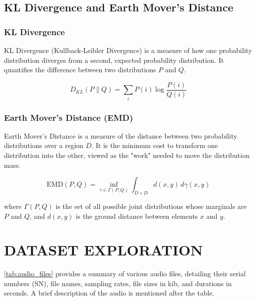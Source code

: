 \documentclass{ioereport}
\begin{document}
    \pagebreak

    \subsection*{KL Divergence and Earth Mover's Distance}

    \subsubsection*{KL Divergence}
    KL Divergence (Kullback-Leibler Divergence) is a measure of how one probability distribution diverges from a second, expected probability distribution. It quantifies the difference between two distributions \( P \) and \( Q \).
    
    \begin{equation}
        D_{KL}(P \parallel Q) = \sum_{i} P(i) \log \frac{P(i)}{Q(i)}
    \end{equation}
    
    \subsubsection*{Earth Mover's Distance (EMD)}
    Earth Mover's Distance is a measure of the distance between two probability distributions over a region \( D \). It is the minimum cost to transform one distribution into the other, viewed as the "work" needed to move the distribution mass.
    
    \begin{equation}
        \text{EMD}(P, Q) = \inf_{\gamma \in \Gamma(P,Q)} \int_{D \times D} d(x, y) \, d\gamma(x, y)
    \end{equation}
    
    where \( \Gamma(P, Q) \) is the set of all possible joint distributions whose marginals are \( P \) and \( Q \), and \( d(x, y) \) is the ground distance between elements \( x \) and \( y \).
    

\section{\MakeUppercase{Dataset Exploration}}
\autoref{tab:audio_files} provides a summary of various audio files, detailing their serial numbers (SN), file names, sampling rates, file sizes in \gls{kib}, and durations in seconds. A brief description of the audio is mentioned after the table.
\end{document}
